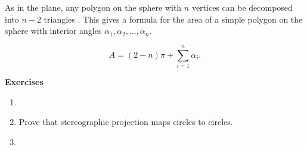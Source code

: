 As in the plane, any polygon on the sphere with $n$ vertices can be decomposed
into $n-2$ triangles \cite{orourke_computational_1994}. This gives a formula for the area of a simple polygon
on the sphere with interior angles $\alpha_1,\alpha_2,\ldots, \alpha_n$.

\begin{equation} \label{eqn:sphere-area}
	A=(2-n)\pi +\sum_{i=1}^n \alpha_i.
\end{equation}



\noindent \textbf{Exercises}


\begin{enumerate}
	\item 
	
	\item Prove that stereographic projection maps circles to circles.
	
	\item 
	
\end{enumerate}

\pagebreak
